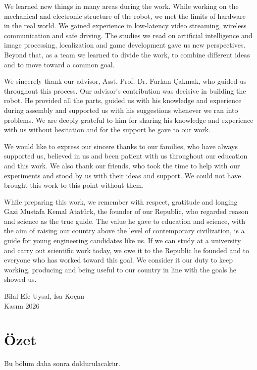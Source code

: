 \documentclass[11pt,a4paper]{article}
\begin{document}
We learned new things in many areas during the work. While working on the mechanical and electronic structure of the robot, we met the limits of hardware in the real world. We gained experience in low-latency video streaming, wireless communication and safe driving. The studies we read on artificial intelligence and image processing, localization and game development gave us new perspectives. Beyond that, as a team we learned to divide the work, to combine different ideas and to move toward a common goal.

We sincerely thank our advisor, Asst. Prof. Dr. Furkan Çakmak, who guided us throughout this process. Our advisor's contribution was decisive in building the robot. He provided all the parts, guided us with his knowledge and experience during assembly and supported us with his suggestions whenever we ran into problems. We are deeply grateful to him for sharing his knowledge and experience with us without hesitation and for the support he gave to our work.

We would like to express our sincere thanks to our families, who have always supported us, believed in us and been patient with us throughout our education and this work. We also thank our friends, who took the time to help with our experiments and stood by us with their ideas and support. We could not have brought this work to this point without them.

While preparing this work, we remember with respect, gratitude and longing Gazi Mustafa Kemal Atatürk, the founder of our Republic, who regarded reason and science as the true guide. The value he gave to education and science, with the aim of raising our country above the level of contemporary civilization, is a guide for young engineering candidates like us. If we can study at a university and carry out scientific work today, we owe it to the Republic he founded and to everyone who has worked toward this goal. We consider it our duty to keep working, producing and being useful to our country in line with the goals he showed us.

\vspace{1.2cm}
\noindent\hfill Bilal Efe Uysal, İsa Koçan\\
\hspace*{\fill}Kasım 2026

\newpage

\section*{Özet}
Bu bölüm daha sonra doldurulacaktır.
\end{document}
